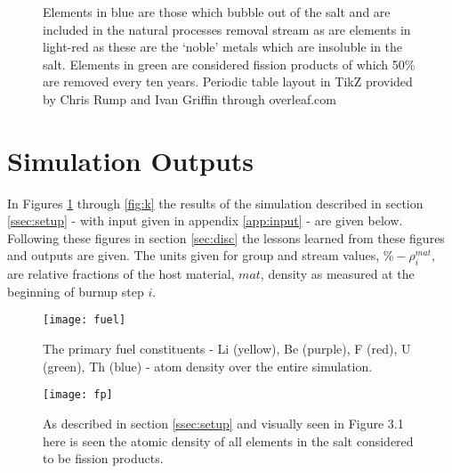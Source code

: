 \begin{figure}
\begin{centering}
\end{centering}
\caption{Elements in blue are those which bubble out of the salt and are
included in the natural processes removal stream as are elements in light-red
as these are the `noble' metals which are insoluble in the salt. Elements in
green are considered fission products of which 50\% are removed every ten
years. Periodic table layout in TikZ provided by Chris Rump and Ivan Griffin
through overleaf.com}
\end{figure}

\section{Simulation Outputs}\label{ssec:outputs}

In Figures \ref{fig:fuel} through \ref{fig:k} the results of the simulation
described in section \ref{ssec:setup} - with input given in appendix 
\ref{app:input} - are given below. Following these figures in section
\ref{sec:disc} the lessons learned from these figures and outputs are
given. The units given for group and stream values, $\%-\rho^{mat}_{i}$, are
relative fractions of the host material, $mat$, density as measured at the 
beginning of burnup step $i$.

\begin{figure}[H]
    \centering
    \texttt{[image: fuel]}
    \caption{The primary fuel constituents - Li (yellow), Be (purple), F (red),
    U (green), Th (blue) - atom density over the entire simulation.}
    \label{fig:fuel}
\end{figure}

\begin{figure}[H]
    \centering
    \texttt{[image: fp]}
    \caption{As described in section \ref{ssec:setup} and visually seen in
    Figure 3.1 here is seen the atomic density of all elements
    in the salt considered to be fission products.}
    \label{fig:fp}
\end{figure}

